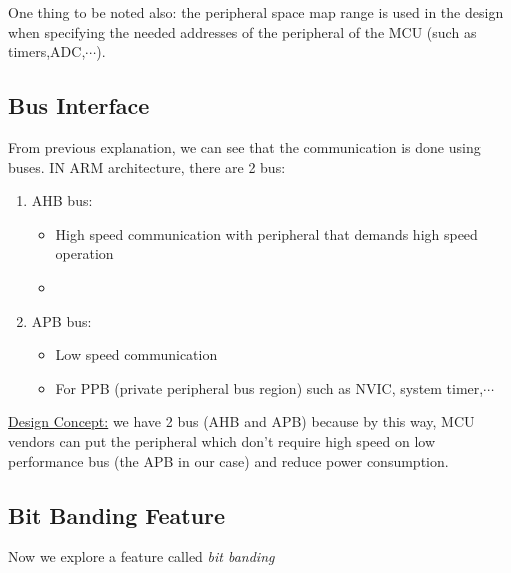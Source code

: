 One thing to be noted also: the peripheral space map range is used in the design when specifying the needed addresses of the peripheral of the MCU (such as timers,ADC,$\cdots$).

\subsection{Bus Interface}

From previous explanation, we can see that the communication is done using buses. IN ARM architecture, there are 2 bus:

\begin{enumerate}
    \item AHB bus:

    \begin{itemize}
        \item High speed communication with peripheral that demands high speed operation

        \item 
    \end{itemize}


    \item APB bus:

    \begin{itemize}
        \item Low speed communication

        \item For PPB (private peripheral bus region) such as NVIC, system timer,$\cdots$
    \end{itemize}
\end{enumerate}


\underline{Design Concept:} we have 2 bus (AHB and APB) because by this way, MCU vendors can put the peripheral which don't require high speed on low performance bus (the APB in our case) and reduce power consumption.


\subsection{Bit Banding Feature}

Now we explore a feature called \textit{bit banding}

